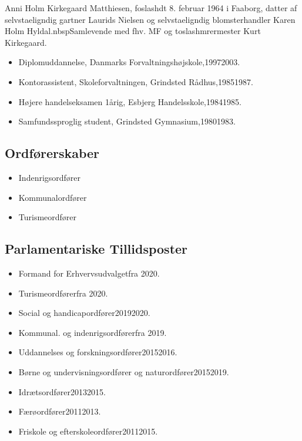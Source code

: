 \documentclass[11pt, a4paper]{awesome-cv}
\begin{document}
\makecvheader[R]
\makelettertitle
\begin{cvletter}
Anni Holm Kirkegaard Matthiesen, foslashdt 8. februar 1964 i Faaborg, datter af selvstaeligndig gartner Laurids Nielsen og selvstaeligndig blomsterhandler Karen Holm Hyldal.nbspSamlevende med fhv. MF og toslashmrermester Kurt Kirkegaard.

\begin{itemize}
\item Diplomuddannelse, Danmarks Forvaltningshøjskole,19972003.
\item Kontorassistent, Skoleforvaltningen, Grindsted Rådhus,19851987.
\item Højere handelseksamen 1årig, Esbjerg Handelsskole,19841985.
\item Samfundssproglig student, Grindsted Gymnasium,19801983.
\end{itemize}
\subsection*{Ordførerskaber}
\begin{itemize}
\item Indenrigsordfører
\item Kommunalordfører
\item Turismeordfører
\end{itemize}
\subsection*{Parlamentariske Tillidsposter}
\begin{itemize}
\item Formand for Erhvervsudvalgetfra 2020.
\item Turismeordførerfra 2020.
\item Social og handicapordfører20192020.
\item Kommunal. og indenrigsordførerfra 2019.
\item Uddannelses og forskningsordfører20152016.
\item Børne og undervisningsordfører og naturordfører20152019.
\item Idrætsordfører20132015.
\item Færøordfører20112013.
\item Friskole og efterskoleordfører20112015.
\end{itemize}

\end{cvletter}
\end{document}
